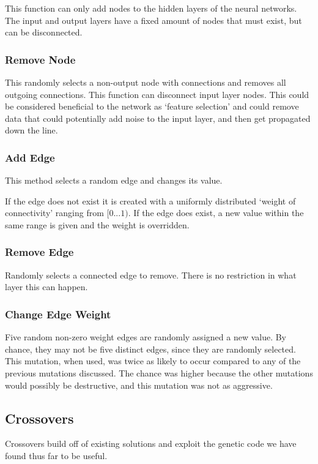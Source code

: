 \documentclass[journal]{IEEEtran}
\begin{document}
      This function can only add nodes to the hidden layers of the neural networks. The input and
       output layers have a fixed amount of nodes that must exist, but can be disconnected.

    \subsubsection{Remove Node}
      This randomly selects a non-output node with connections and removes all outgoing
      connections. This function can disconnect input layer nodes. This could be considered
      beneficial to the network as `feature selection' and could remove data that could
      potentially add noise to the input layer, and then get propagated down the line.

    \subsubsection{Add Edge}
      This method selects a random edge and changes its value.

      If the edge does not exist it is created with a uniformly distributed `weight of connectivity'
      ranging from $ [0...1) $.
      If the edge does exist, a new value within the same range is given and the weight is overridden.

    \subsubsection{Remove Edge}
      Randomly selects a connected edge to remove. There is no restriction in what layer this can happen.

    \subsubsection{Change Edge Weight}
      Five random non-zero weight edges are randomly assigned a new value. By chance, they may not be five
      distinct edges, since they are randomly selected. This mutation, when used, was twice as likely
      to occur compared to any of the previous mutations discussed. The chance was higher because the
      other mutations would possibly be destructive, and this mutation was not as aggressive.

  \subsection{Crossovers}
  Crossovers build off of existing solutions and exploit the genetic code we have found thus far to be useful.
\end{document}
